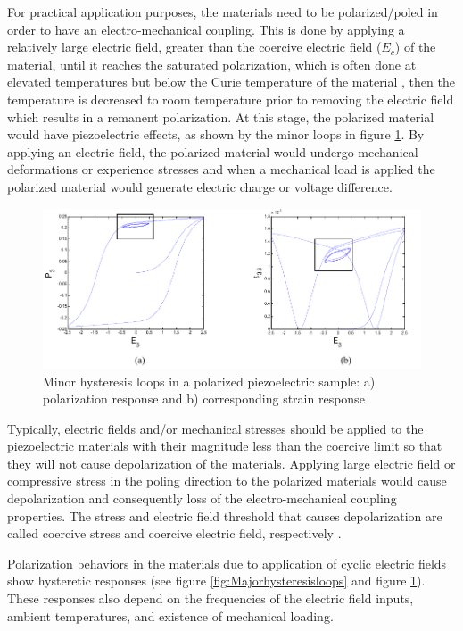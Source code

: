 For practical application purposes, the materials need to be polarized/poled in order to have an electro-mechanical coupling. 
This is done by applying a relatively large electric field, greater than the coercive electric field ($E_c$) of the material,
 until it reaches the saturated polarization,
  which is often done at elevated temperatures but below the Curie temperature of the material \cite{Lines1977},
   then the temperature is decreased to room temperature prior to removing the electric field which results in a remanent polarization. 
At this stage, the polarized material would have piezoelectric effects, as shown by the minor loops in figure \ref{fig:Manorhysteresisloops}. 
By applying an electric field, the polarized material would undergo mechanical deformations or experience stresses and when a mechanical load is applied the polarized material would generate electric charge or voltage difference. 
\begin{figure}
\centering
\includegraphics[width=6in]{./chap_2_pol_sw/figures/minorloop_polarization_switching.pdf}
\caption{Minor hysteresis loops in a polarized piezoelectric sample: a) polarization response and b) corresponding strain response}
\label{fig:Manorhysteresisloops}
\end{figure} 
Typically, electric fields and/or mechanical stresses should be applied to the piezoelectric materials with their magnitude less than the coercive limit so that they will not cause depolarization of the materials. 
Applying large electric field or compressive stress in the poling direction to the polarized materials would cause depolarization and  consequently loss of the electro-mechanical coupling properties. 
The stress and electric field threshold that causes depolarization are called coercive stress and coercive electric field, respectively \cite{Sohrabi201344}.

Polarization behaviors in the materials due to application of cyclic electric fields show hysteretic responses (see figure \ref{fig:Majorhysteresisloops} and figure \ref{fig:Manorhysteresisloops}). 
These responses also depend on the frequencies of the electric field inputs, ambient temperatures, and existence of mechanical loading. 


